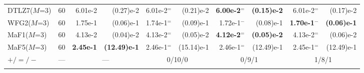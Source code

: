 \begin{table}[t]
\begin{tabular}{lrrrrrrrrr}
		DTLZ7($M$=3) & 60  & 6.01e-2                                  & (0.27)e-2                  & 6.01e-2$^{=}$              & (0.21)e-2                   & \textbf{6.00e-2$^{=}$} & \textbf{(0.15)e-2} & 6.01e-2$^{=}$          & (0.17)e-2           \\
		WFG2($M$=3)  & 60  & 1.75e-1                                  & (0.06)e-1                  & 1.74e-1$^{=}$              & (0.09)e-1                   & 1.72e-1$^{-}$          & (0.08)e-1          & \textbf{1.70e-1$^{-}$} & \textbf{(0.06)e-1}  \\
		MaF1($M$=3)  & 60  & 4.13e-2                                  & (0.04)e-2                  & 4.13e-2$^{=}$              & (0.05)e-2                   & \textbf{4.12e-2$^{=}$} & \textbf{(0.05)e-2} & 4.13e-2$^{=}$          & (0.06)e-2           \\
		MaF5($M$=3)  & 60  & \textbf{2.45e-1}                         & \textbf{(12.49)e-1}        & 2.46e-1$^{=}$              & (15.14)e-1                  & 2.46e-1$^{=}$          & (12.49)e-1         & 2.45e-1$^{=}$          & (12.49)e-1          \\
		\midrule
		$+/=/-$      & --- & \multicolumn{2}{c}{---}                  & \multicolumn{2}{c}{0/10/0} & \multicolumn{2}{c}{0/9/1}  & \multicolumn{2}{c}{1/8/1}                                                                                                \\
		\botrule
	\end{tabular}
\end{table}
